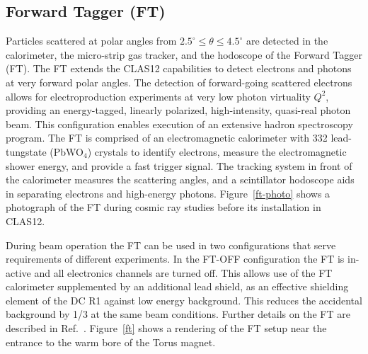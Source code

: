 \documentclass[final,3p,twocolumn]{elsarticle}
\begin{document}
\subsection{Forward Tagger (FT)}

Particles scattered at polar angles from $2.5^\circ \le \theta \le 4.5^\circ $ are detected in the calorimeter, the
micro-strip gas tracker, and the hodoscope of the Forward Tagger (FT). The FT extends the CLAS12 capabilities to
detect electrons and photons at very forward polar angles. The detection of forward-going scattered electrons allows
for electroproduction experiments at very low photon virtuality $Q^2$, providing an energy-tagged, linearly polarized,
high-intensity, quasi-real photon beam. This configuration enables execution of an extensive hadron spectroscopy
program. The FT is comprised of an electromagnetic calorimeter with 332 lead-tungstate (PbWO$_4$) crystals to
identify electrons,  measure the electromagnetic shower energy, and provide a fast trigger signal. The tracking system
in front of the calorimeter  measures the scattering angles, and a scintillator hodoscope aids in separating electrons and
high-energy photons. Figure~\ref{ft-photo} shows a photograph of the FT during cosmic ray studies before its installation
in CLAS12. 

During beam operation the FT can be used in two configurations that serve requirements of different experiments. In the FT-OFF 
configuration the FT is in-active and all electronics channels are turned off. This allows use of the FT calorimeter supplemented by 
an additional lead shield, as an effective shielding element of the DC R1 against low energy background. This reduces the 
accidental background by 1/3 at the same beam conditions. Further details on the FT are described in Ref.~\cite{FT}. Figure~\ref{ft} shows a rendering of the FT setup near the entrance to the warm bore of the Torus magnet.   
\end{document}
